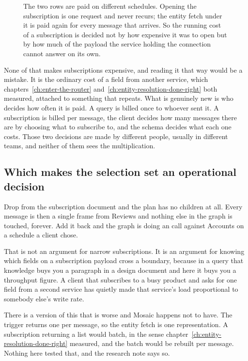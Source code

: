 \begin{figure}[htbp]
  \centering
  
  \caption{The two rows are paid on different schedules. Opening the
  subscription is one request and never recurs; the entity fetch under it is
  paid again for every message that arrives. So the running cost of a
  subscription is decided not by how expensive it was to open but by how much
  of the payload the service holding the connection cannot answer on its own.}
  \label{fig:ch14-what-repeats}
\end{figure}

None of that makes subscriptions expensive, and reading it that way would be a
mistake. It is the ordinary cost of a field from another service, which
chapters~\ref{ch:enter-the-router} and~\ref{ch:entity-resolution-done-right}
both measured, attached to something that repeats. What is genuinely new is who
decides how often it is paid. A query is billed once to whoever sent it. A
subscription is billed per message, the client decides how many messages there
are by choosing what to subscribe to, and the schema decides what each one
costs. Those two decisions are made by different people, usually in different
teams, and neither of them sees the multiplication.

\subsection*{Which makes the selection set an operational decision}

%
Drop  from the subscription document and the plan has no children
at all. Every message is then a single frame from Reviews and nothing else in
the graph is touched, forever. Add it back and the graph is doing an
 call against Accounts on a schedule a client chose.

That is not an argument for narrow subscriptions. It is an argument for knowing
which fields on a subscription payload cross a boundary, because in a query
that knowledge buys you a paragraph in a design document and here it buys you a
throughput figure. A client that subscribes to a busy product and asks for one
field from a second service has quietly made that service's load proportional
to somebody else's write rate.

%
There is a version of this that is worse and Mosaic happens not to have. The
trigger returns one  per message, so the entity fetch is one
representation. A subscription returning a list would batch, in the sense
chapter~\ref{ch:entity-resolution-done-right} measured, and the batch would be
rebuilt per message. Nothing here tested that, and the research note says so.

